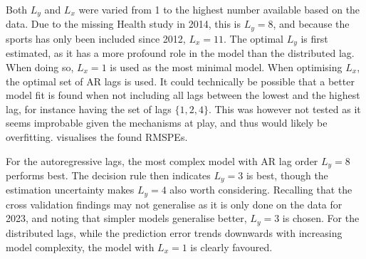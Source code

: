 Both $L_y$ and $L_x$ were varied from 1 to the highest number available based on the data.
Due to the missing Health study in 2014, this is $L_y = 8$, and because the sports has only been included since 2012,
$L_x = 11$.
The optimal $L_y$ is first estimated, as it has a more profound role in the model than the distributed lag.
When doing so, $L_x = 1$ is used as the most minimal model. When optimising $L_x$, the optimal set of AR lags is used.
It could technically be possible that a better model fit is found when not including all lags between the lowest
and the highest lag, for instance having the set of lags $\{1, 2, 4\}$. This was however not tested as it seems improbable
given the mechanisms at play, and thus would likely be overfitting.
 visualises the found RMSPEs.

\begin{figure}[htbp]
    \centering
    \caption{Cross validated out-of-sample forecasting accuracy for varying lag orders, measured by root mean square error.
    Errorbars are standard deviations of accuracy across folds. The horizontal line represents the 1-$\sigma$ decision rule.
    The smaller errorbars represent uncertainty in $\mu_{\text{RMSPE}} + \sigma_{\text{RMSPE}}$}
    \label{fig:modelling:cv_lags}
    \begin{subfigure}[t]{0.49\textwidth}
        \centering
        
        \vspace{0.1em}
    \end{subfigure}
    \hfill
    \begin{subfigure}[t]{0.49\textwidth}
        \centering
        
        \vspace{0.1em}
    \end{subfigure}
\end{figure}

For the autoregressive lags, the most complex model with AR lag order $L_y = 8$ performs best. The decision rule
then indicates $L_y = 3$ is best, though the estimation uncertainty makes $L_y = 4$ also worth considering.
Recalling that the cross validation findings may not generalise as it is only done on the data for 2023, and noting that
simpler models generalise better, $L_y = 3$ is chosen.
For the distributed lags, while the prediction error trends downwards with increasing model complexity,
the model with $L_x = 1$ is clearly favoured.

